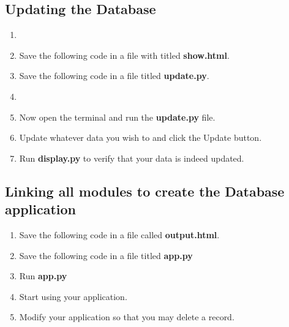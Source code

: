 \documentclass[journal,12pt,twocolumn]{IEEEtran}
\begin{document}
\subsection{Updating the Database}
\begin{enumerate}
\item 
    
\item Save the following code in a file with titled \textbf{show.html}.


\item Save the following code in a file titled \textbf{update.py}.
\item 
\item Now open the terminal and run the \textbf{update.py} file.
\item Update whatever data you wish to and click the Update button.
\item Run \textbf{display.py} to verify that your data is indeed updated.
\end{enumerate}
\subsection{Linking all modules to create the Database application}
\begin{enumerate}
\item Save the following code in a file called \textbf{output.html}.


\item Save the following code in a file titled \textbf{app.py}

\item Run \textbf{app.py}
\item Start using your application.
\item Modify your application so that you may delete a record.
\end{enumerate}
\end{document}
